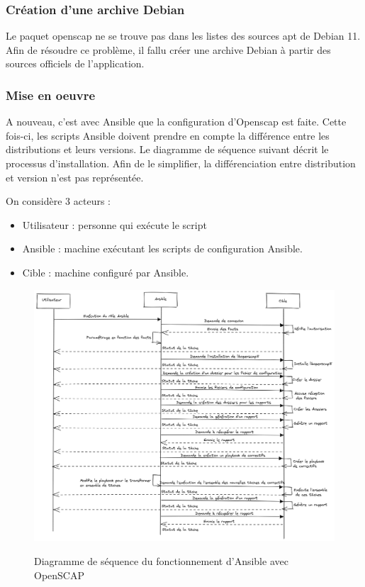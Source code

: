 \documentclass[12pt]{article}
\begin{document}
\subsubsection{Création d'une archive Debian}
Le paquet openscap ne se trouve pas dans les listes des sources apt de Debian 11. Afin de résoudre ce problème, il fallu créer une archive Debian à partir des sources officiels de l'application.

\subsubsection{Mise en oeuvre}
A nouveau, c'est avec Ansible que la configuration d'Openscap est faite. Cette fois-ci, les scripts Ansible doivent prendre en compte la différence entre les distributions et leurs versions.
Le diagramme de séquence suivant décrit le processus d'installation. Afin de le simplifier, la différenciation entre distribution et version n'est pas représentée.

On considère 3 acteurs :
\begin{itemize}
    \item Utilisateur : personne qui exécute le script
    \item Ansible : machine exécutant les scripts de configuration Ansible.
    \item Cible : machine configuré par Ansible.
\end{itemize}

\newpage
\begin{figure}[!ht]
    \centering
    \includegraphics[width=\textwidth]{src/Ansible oscap.png}
    \label{fig:ansible_oscap}
    \caption{Diagramme de séquence du fonctionnement d'Ansible avec OpenSCAP}
\end{figure}
\end{document}
